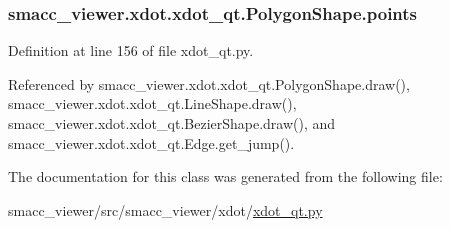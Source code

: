 \subsubsection[{\texorpdfstring{points}{points}}]{\setlength{\rightskip}{0pt plus 5cm}smacc\+\_\+viewer.\+xdot.\+xdot\+\_\+qt.\+Polygon\+Shape.\+points}\hypertarget{classsmacc__viewer_1_1xdot_1_1xdot__qt_1_1PolygonShape_a01107adea1ab0c6fc4c369c32e5f3393}{}\label{classsmacc__viewer_1_1xdot_1_1xdot__qt_1_1PolygonShape_a01107adea1ab0c6fc4c369c32e5f3393}


Definition at line 156 of file xdot\+\_\+qt.\+py.



Referenced by smacc\+\_\+viewer.\+xdot.\+xdot\+\_\+qt.\+Polygon\+Shape.\+draw(), smacc\+\_\+viewer.\+xdot.\+xdot\+\_\+qt.\+Line\+Shape.\+draw(), smacc\+\_\+viewer.\+xdot.\+xdot\+\_\+qt.\+Bezier\+Shape.\+draw(), and smacc\+\_\+viewer.\+xdot.\+xdot\+\_\+qt.\+Edge.\+get\+\_\+jump().



The documentation for this class was generated from the following file\+:\begin{DoxyCompactItemize}
\item 
smacc\+\_\+viewer/src/smacc\+\_\+viewer/xdot/\hyperlink{xdot__qt_8py}{xdot\+\_\+qt.\+py}\end{DoxyCompactItemize}
